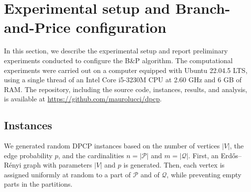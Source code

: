 \documentclass[preprint, 11pt, authoryear]{elsarticle}
\newcommand{\PP}{{\mathcal P}}
\newcommand{\QQ}{{\mathcal Q}}
\begin{document}
\section{Experimental setup and Branch-and-Price configuration}
\label{sec:B&Pconfigurations}

In this section, we describe the experimental setup and report preliminary experiments conducted to configure the B\&P algorithm. 
The computational experiments were carried out on a computer equipped with Ubuntu 22.04.5 LTS, using a single thread of an Intel Core i5-3230M CPU at 2.60 GHz and 6 GB of RAM.  
The repository, including the source code, instances, results, and analysis, is available at \url{https://github.com/maurolucci/dpcp}.

\subsection{Instances}

We generated random DPCP instances based on the number of vertices $|V|$, the edge probability $p$, and the cardinalities  $n = |\PP|$ and $m = |\QQ|$. 
First, an Erdős–Rényi graph with parameters $|V|$ and $p$ is generated. 
Then, each vertex is assigned uniformly at random to a part of $\PP$ and of $\QQ$, while preventing  empty parts in the partitions.
\end{document}
